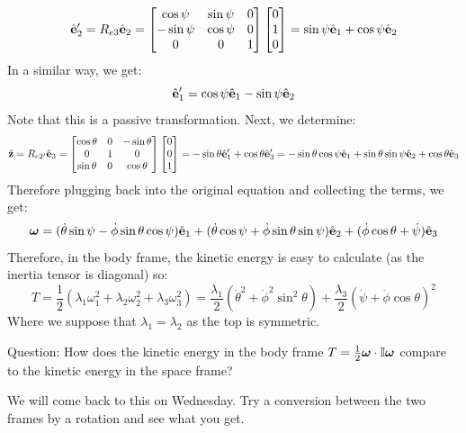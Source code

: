 \documentclass[../PHYS306Notes.tex]{subfiles}
\begin{document}
\[\hat{\mathbf{e}}_2' = R_{e3}\hat{\mathbf{e}}_2 = \begin{bmatrix}\cos\psi & \sin\psi & 0 \\ -\sin\psi & \cos\psi & 0 \\ 0 & 0 & 1\end{bmatrix}\begin{bmatrix}0 \\ 1 \\ 0\end{bmatrix} = \sin\psi\hat{\mathbf{e}}_1 + \cos\psi\hat{\mathbf{e}}_2 \]
In a similar way, we get:
\[\hat{\mathbf{e}}_1' = \cos\psi\hat{\mathbf{e}}_1 - \sin\psi\hat{\mathbf{e}}_2\]
Note that this is a passive transformation. Next, we determine:
\[\hat{\mathbf{z}} = R_{e2'}\hat{\mathbf{e}}_3 = \begin{bmatrix}\cos\theta & 0 & -\sin\theta \\ 0 & 1 & 0 \\ \sin\theta & 0 & \cos\theta\end{bmatrix}\begin{bmatrix}0 \\ 0 \\1\end{bmatrix} = -\sin\theta\hat{\mathbf{e}}_1' + \cos\theta\hat{\mathbf{e}}_3' = -\sin\theta\cos\psi\hat{\mathbf{e}}_1 + \sin\theta\sin\psi\hat{\mathbf{e}}_2 + \cos\theta\hat{\mathbf{e}}_3\]
Therefore plugging back into the original equation and collecting the terms, we get:
\[\bm{\omega} = (\dot{\theta}\sin\psi - \dot{\phi}\sin\theta\cos\psi)\hat{\mathbf{e}}_1 + (\dot{\theta}\cos\psi+\dot{\phi}\sin\theta\sin\psi)\hat{\mathbf{e}}_2 + (\dot{\phi}\cos\theta + \dot{\psi})\hat{\mathbf{e}}_3\]
Therefore, in the body frame, the kinetic energy is easy to calculate (as the inertia tensor is diagonal) so:
\[T = \frac{1}{2}\left(\lambda_1\omega_1^2 + \lambda_2\omega_2^2 + \lambda_3\omega_3^2\right) = \frac{\lambda_1}{2}(\dot{\theta}^2 + \dot{\phi}^2\sin^2\theta) + \frac{\lambda_3}{2}(\dot{\psi} + \dot{\phi}\cos\theta)^2 \]
Where we suppose that $\lambda_1 = \lambda_2$ as the top is symmetric.

\noindent Question: How does the kinetic energy in the body frame $T = \frac{1}{2}\bm{\omega} \cdot \mathbb{I} \bm{\omega}$ compare to the kinetic energy in the space frame?
\begin{s}
We will come back to this on Wednesday. Try a conversion between the two frames by a rotation and see what you get.
\end{s}
\end{document}

